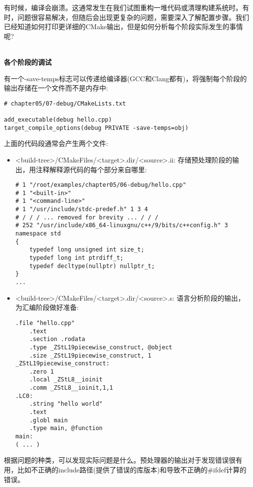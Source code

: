 有时候，编译会崩溃。这通常发生在我们试图重构一堆代码或清理构建系统时。有时，问题很容易解决，但随后会出现更复杂的问题，需要深入了解配置步骤。我们已经知道如何打印更详细的CMake输出，但是如何分析每个阶段实际发生的事情呢?

\hspace*{\fill} \\ %
\noindent
\textbf{各个阶段的调试}

有一个-save-temps标志可以传递给编译器(GCC和Clang都有)，将强制每个阶段的输出存储在一个文件而不是内存中:

\begin{lstlisting}[style=styleCMake]
# chapter05/07-debug/CMakeLists.txt

add_executable(debug hello.cpp)
target_compile_options(debug PRIVATE -save-temps=obj)
\end{lstlisting}

上面的代码段通常会产生两个文件:

\begin{itemize}
\item 
<build-tree>/CMakeFiles/<target>.dir/<source>.ii: 存储预处理阶段的输出，用注释解释源代码的每个部分来自哪里:

\begin{lstlisting}[style=styleCXX]
# 1 "/root/examples/chapter05/06-debug/hello.cpp"
# 1 "<built-in>"
# 1 "<command-line>"
# 1 "/usr/include/stdc-predef.h" 1 3 4
# / / / ... removed for brevity ... / / /
# 252 "/usr/include/x86_64-linuxgnu/c++/9/bits/c++config.h" 3
namespace std
{
	typedef long unsigned int size_t;
	typedef long int ptrdiff_t;
	typedef decltype(nullptr) nullptr_t;
}
...
\end{lstlisting}
	
\item 
<build-tree>/CMakeFiles/<target>.dir/<source>.s: 语言分析阶段的输出，为汇编阶段做好准备:

\begin{lstlisting}[style=styleCXX]
	.file "hello.cpp"
	.text
	.section .rodata
	.type _ZStL19piecewise_construct, @object
	.size _ZStL19piecewise_construct, 1
_ZStL19piecewise_construct:
	.zero 1
	.local _ZStL8__ioinit
	.comm _ZStL8__ioinit,1,1
.LC0:
	.string "hello world"
	.text
	.globl main
	.type main, @function
main:
( ... )
\end{lstlisting}

\end{itemize}

根据问题的种类，可以发现实际问题是什么。预处理器的输出对于发现错误很有用，比如不正确的include路径(提供了错误的库版本)和导致不正确的\#ifdef计算的错误。

